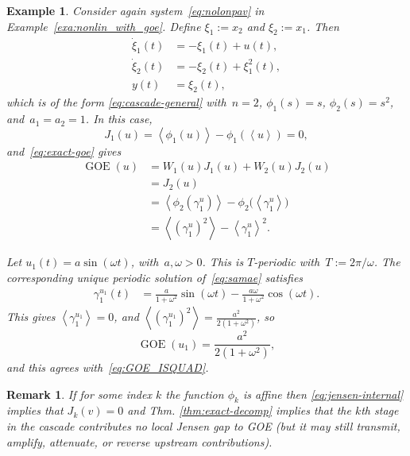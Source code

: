 \documentclass[onecolumn]{IEEEtran}
\newcommand{\GOE}{\operatorname{GOE}}
\newcommand{\avg}[1]{\left\langle #1\right\rangle}
\newtheorem{remark}[theorem]{Remark}
\newtheorem{example}[theorem]{Example}
\begin{document}
\begin{example}
    Consider   again system~\eqref{eq:nolonpav} in Example~\ref{exa:nonlin_with_goe}. 
Define
   $ \xi_1:=x_2$ and
    $\xi_2:=x_1$.
Then  
\begin{align}\label{eq:samae}
    \dot \xi_1(t)
    &=
    -\xi_1(t)+u(t),\nonumber\\
    \dot \xi_2(t)
    &=
    -\xi_2(t)+\xi_1^2(t),\nonumber\\
    y(t)&=\xi_2(t),
\end{align}
which is   of the form
\eqref{eq:cascade-general} with~$n=2$, 
$\phi_1(s)=s$, $\phi_2(s)=s^2$, and~$a_1=a_2=1$.
In this case,
\[
J_1(u)=  \avg{\phi_1(u)}-\phi_1(\avg{ u})=0,
\]
and~\eqref{eq:exact-goe} 
gives
\begin{align*}
    \GOE (u) &= W_1(u) J_1(u)+W_2(u) J_2(u) \\
          &=     J_2(u)\\
          &=
       \avg{\phi_2(\gamma_{1}^u)}
    -
    \phi_2\bigl(\avg{\gamma_{1}^u}\bigr)\\
    & =   \avg{ (\gamma_{1}^u)^2}
    -
 \avg{\gamma_{1}^u} ^2
    .
\end{align*}

Let
    $u_1(t)=a\sin(\omega t)$, with~$a,\omega>0$. This is  $T$-periodic with~$T:=2\pi/\omega$. 
 The corresponding 
 unique periodic solution of~\eqref{eq:samae} 
 satisfies
\begin{align*}
    \gamma_1^{u_1}(t)
    &=
    \frac{a}{1+\omega^2}\sin(\omega t)
    -
    \frac{a\omega}{1+\omega^2}\cos(\omega t).
    \label{eq:gamma2-positive}
\end{align*}
This gives  $\avg{\gamma_1^{u_1}}=0$,   
and
  $  \avg{(\gamma_1^{u_1})^2}
    =    \frac{a^2}{2(1+\omega^2)}$,
    so
\begin{equation*} 
    \GOE(u_1)
    =
    \frac{a^2}{2(1+\omega^2)}
     ,
\end{equation*}
and this agrees with~\eqref{eq:GOE_ISQUAD}. 
\end{example}

\begin{remark}
    If for some index $k$ the function $\phi_k$   is affine then \eqref{eq:jensen-internal} implies that
$J_k(v) =0 $ and Thm. \ref{thm:exact-decomp} implies that the $k$th stage in the cascade    contributes  no local Jensen gap to GOE (but it may still transmit, amplify, attenuate, or reverse upstream contributions).
\end{remark}
\end{document}
